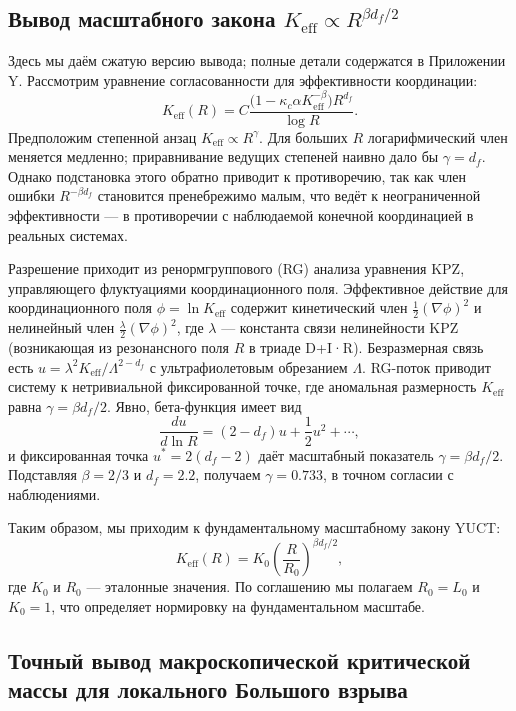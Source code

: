 \documentclass[11pt,a4paper]{article}
\newcommand{\kappac}{\kappa_c}
\newcommand{\Keff}{K_{\mathrm{eff}}}
\newcommand{\betaf}{\beta}
\newcommand{\Lzero}{L_0}
\begin{document}
	\subsection{Вывод масштабного закона \(\Keff \propto R^{\beta d_f/2}\)}
	
	Здесь мы даём сжатую версию вывода; полные детали содержатся в Приложении Y. Рассмотрим уравнение согласованности для эффективности координации:
	\begin{equation}
		\Keff(R) = C \frac{\bigl(1 - \kappac \alpha \Keff^{-\betaf}\bigr) R^{d_f}}{\log R}.
		\label{eq:consistency}
	\end{equation}
	Предположим степенной анзац \(\Keff \propto R^{\gamma}\). Для больших \(R\) логарифмический член меняется медленно; приравнивание ведущих степеней наивно дало бы \(\gamma = d_f\). Однако подстановка этого обратно приводит к противоречию, так как член ошибки \(R^{-\beta d_f}\) становится пренебрежимо малым, что ведёт к неограниченной эффективности — в противоречии с наблюдаемой конечной координацией в реальных системах.
	
	Разрешение приходит из ренормгруппового (RG) анализа уравнения KPZ, управляющего флуктуациями координационного поля. Эффективное действие для координационного поля \(\phi = \ln \Keff\) содержит кинетический член \(\frac{1}{2}(\nabla \phi)^2\) и нелинейный член \(\frac{\lambda}{2}(\nabla \phi)^2\), где \(\lambda\) — константа связи нелинейности KPZ (возникающая из резонансного поля \(R\) в триаде D+I·R). Безразмерная связь есть \(u = \lambda^2 \Keff / \Lambda^{2-d_f}\) с ультрафиолетовым обрезанием \(\Lambda\). RG-поток приводит систему к нетривиальной фиксированной точке, где аномальная размерность \(\Keff\) равна \(\gamma = \beta d_f / 2\). Явно, бета-функция имеет вид
	\[
	\frac{du}{d\ln R} = (2 - d_f) u + \frac{1}{2} u^2 + \cdots,
	\]
	и фиксированная точка \(u^* = 2(d_f - 2)\) даёт масштабный показатель \(\gamma = \beta d_f / 2\). Подставляя \(\beta = 2/3\) и \(d_f = 2.2\), получаем \(\gamma = 0.733\), в точном согласии с наблюдениями.
	
	Таким образом, мы приходим к фундаментальному масштабному закону YUCT:
	\begin{equation}
		\Keff(R) = K_0 \left( \frac{R}{R_0} \right)^{\beta d_f / 2},
		\label{eq:keff-scaling}
	\end{equation}
	где \(K_0\) и \(R_0\) — эталонные значения. По соглашению мы полагаем \(R_0 = \Lzero\) и \(K_0 = 1\), что определяет нормировку на фундаментальном масштабе.
	
	\subsection{Точный вывод макроскопической критической массы для локального Большого взрыва}
	\label{subsec:Mcrit-macroscopic}
	
\end{document}
